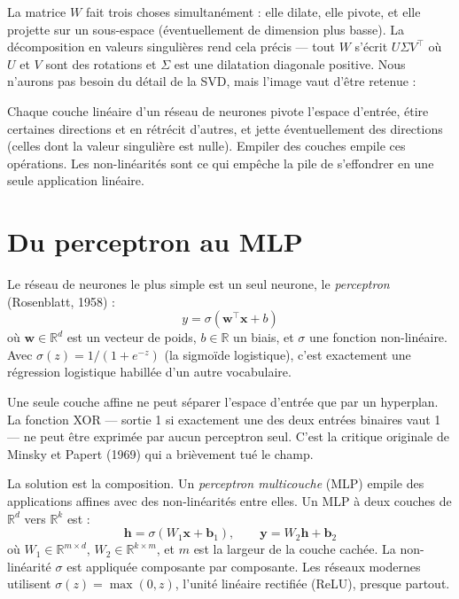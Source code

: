 La matrice $W$ fait trois choses simultanément : elle dilate, elle pivote, et elle projette sur un sous-espace (éventuellement de dimension plus basse). La décomposition en valeurs singulières rend cela précis --- tout $W$ s'écrit $U \Sigma V^\top$ où $U$ et $V$ sont des rotations et $\Sigma$ est une dilatation diagonale positive. Nous n'aurons pas besoin du détail de la SVD, mais l'image vaut d'être retenue :

\begin{intuition}
Chaque couche linéaire d'un réseau de neurones pivote l'espace d'entrée, étire certaines directions et en rétrécit d'autres, et jette éventuellement des directions (celles dont la valeur singulière est nulle). Empiler des couches empile ces opérations. Les non-linéarités sont ce qui empêche la pile de s'effondrer en une seule application linéaire.
\end{intuition}

\section{Du perceptron au MLP}

Le réseau de neurones le plus simple est un seul neurone, le \emph{perceptron} (Rosenblatt, 1958) :
\[
y = \sigma(\bm{w}^\top \bm{x} + b)
\]
où $\bm{w} \in \mathbb{R}^d$ est un vecteur de poids, $b \in \mathbb{R}$ un biais, et $\sigma$ une fonction non-linéaire. Avec $\sigma(z) = 1/(1 + e^{-z})$ (la sigmoïde logistique), c'est exactement une régression logistique habillée d'un autre vocabulaire.

\begin{proposition}
Une seule couche affine ne peut séparer l'espace d'entrée que par un hyperplan. La fonction XOR --- sortie 1 si exactement une des deux entrées binaires vaut 1 --- ne peut être exprimée par aucun perceptron seul. C'est la critique originale de Minsky et Papert (1969) qui a brièvement tué le champ.
\end{proposition}

La solution est la composition. Un \emph{perceptron multicouche} (MLP) empile des applications affines avec des non-linéarités entre elles. Un MLP à deux couches de $\mathbb{R}^d$ vers $\mathbb{R}^k$ est :
\[
\bm{h} = \sigma(W_1 \bm{x} + \bm{b}_1), \qquad \bm{y} = W_2 \bm{h} + \bm{b}_2
\]
où $W_1 \in \mathbb{R}^{m \times d}$, $W_2 \in \mathbb{R}^{k \times m}$, et $m$ est la largeur de la couche cachée. La non-linéarité $\sigma$ est appliquée composante par composante. Les réseaux modernes utilisent $\sigma(z) = \max(0, z)$, l'unité linéaire rectifiée (ReLU), presque partout.

